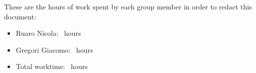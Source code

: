 These are the hours of work spent by each group member in order to redact this document:
\begin{itemize}  
\item Ruaro Nicola: \worktimeNicola \ hours
\item Gregori Giacomo: \worktimeGiacomo \ hours
\item Total worktime: \worktimeTotal \ hours
\end{itemize}
